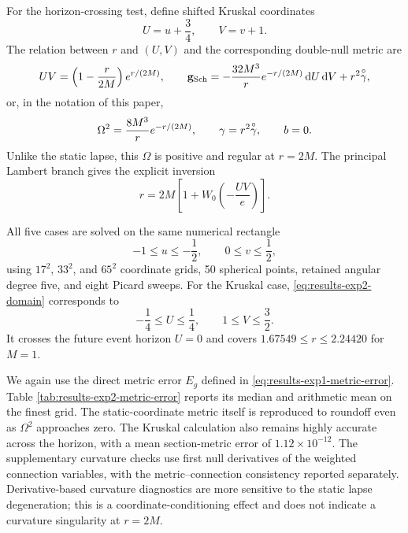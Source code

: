 For the horizon-crossing test, define shifted Kruskal coordinates
\begin{equation}
  U=u+\frac34,\qquad V=v+1.
\end{equation}
The relation between $r$ and $(U,V)$ and the corresponding double-null metric
are
\begin{equation}\label{eq:results-kruskal-double-null}
  UV=\left(1-\frac{r}{2M}\right)e^{r/(2M)},\qquad
  \mathbf g_{\mathrm{Sch}}
  =-\frac{32M^3}{r}e^{-r/(2M)}\mathop{}\!\mathrm d U\mathop{}\!\mathrm d V+r^2\overset{\circ}{\gamma},
\end{equation}
or, in the notation of this paper,
\begin{equation}
  \Omega^2=\frac{8M^3}{r}e^{-r/(2M)},\qquad
  \gamma=r^2\overset{\circ}{\gamma},\qquad b=0.
\end{equation}
Unlike the static lapse, this $\Omega$ is positive and regular at $r=2M$.
The principal Lambert branch gives the explicit inversion
\begin{equation}
  r=2M\left[1+
  W_0\left(-\frac{UV}{e}\right)\right].
\end{equation}

All five cases are solved on the same numerical rectangle
\begin{equation}\label{eq:results-exp2-domain}
  -1\leq u\leq-\frac12,\qquad 0\leq v\leq\frac12,
\end{equation}
using $17^2$, $33^2$, and $65^2$ coordinate grids, 50 spherical points,
retained angular degree five, and eight Picard sweeps.  For the Kruskal case,
\eqref{eq:results-exp2-domain} corresponds to
\begin{equation}
  -\frac14\leq U\leq\frac14,\qquad
  1\leq V\leq\frac32.
\end{equation}
It crosses the future event horizon $U=0$ and covers
$1.67549\leq r\leq2.24420$ for $M=1$.

We again use the direct metric error $E_g$ defined in
\eqref{eq:results-exp1-metric-error}.  Table
\ref{tab:results-exp2-metric-error} reports its median and arithmetic mean on
the finest grid.  The static-coordinate metric itself is reproduced to
roundoff even as $\Omega^2$ approaches zero.  The Kruskal calculation also
remains highly accurate across the horizon, with a mean section-metric error
of $1.12\times10^{-12}$.  The supplementary curvature checks use first null derivatives of the
weighted connection variables, with the metric--connection consistency
reported separately.
Derivative-based curvature diagnostics are more sensitive to the static lapse
degeneration; this is a coordinate-conditioning effect and does not indicate
a curvature singularity at $r=2M$.

